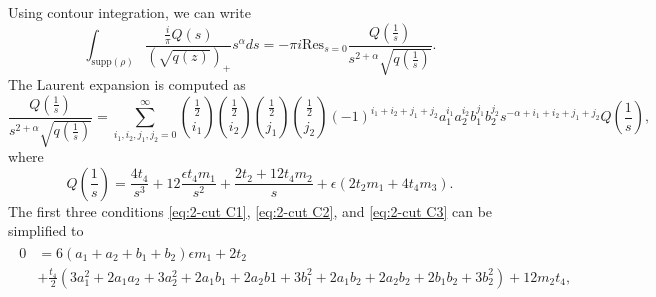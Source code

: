 \documentclass[10pt]{article}
\newcommand{\res}{\mathrm{Res}}
\theoremstyle{plain}
\theoremstyle{definition}
\theoremstyle{plain}
\begin{document}
Using contour integration, we can write 
\begin{equation*}
 \int_{\text{supp}(\rho)} \frac{\frac{i}{\pi}Q(s)}{(\sqrt{q(z)})_{+}}s^{\alpha}ds = -\pi i\res_{s =0}\frac{Q\left(\frac{1}{s}\right)}{s^{2+\alpha} \sqrt{q\left(\frac{1}{s}\right)}}. 
\end{equation*}
The Laurent expansion is computed as 
\begin{equation*}
 \frac{Q\left(\frac{1}{s}\right)}{s^{2+\alpha} \sqrt{q\left(\frac{1}{s}\right)}} = \sum_{i_{1},i_{2},j_{1},j_{2} =0}^\infty {\frac{1}{2} \choose i_{1}} {\frac{1}{2} \choose i_{2}} {\frac{1}{2} \choose j_{1}} {\frac{1}{2} \choose j_{2}}(-1)^{i_{1} +i_{2}+j_{1}+j_{2}}a_{1}^{i_{1}}a_{2}^{i_{2}}b_{1}^{j_{1}}b_{2}^{j_{2}} s^{-\alpha+i_{1} +i_{2}+j_{1}+j_{2}}Q\left(\frac{1}{s}\right),
\end{equation*}
where 
\begin{equation*}
 Q\left(\frac{1}{s}\right) = \frac{4 t_{4}}{s^3}+ 12 \frac{\epsilon t_4 m_{1}}{s^2} + \frac{2 t_{2} + 12 t_{4}m_{2}}{s} + \epsilon( 2t_{2} m_{1} + 4 t_{4}m_{3}).
\end{equation*}
The first three conditions \eqref{eq:2-cut C1}, \eqref{eq:2-cut C2}, and \eqref{eq:2-cut C3} can be simplified to
\begin{align*}
\begin{split}
 0&=6 (a_1 + a_2 + b_1 + b_2) \epsilon m_1 + 2 t_2 \\
 &+ 
 \frac{t_4}{2} (3 a_1^2 + 2 a_1 a_2 + 3 a_2^2 + 2 a_1 b_1 + 2 a_2 b1 + 3 b_1^2 + 
 2 a_1 b_2 + 2 a_2 b_2 + 2 b_1 b_2 + 3 b_2^2) + 12 m_2 t_4,
 \end{split}
\end{align*}
\end{document}
